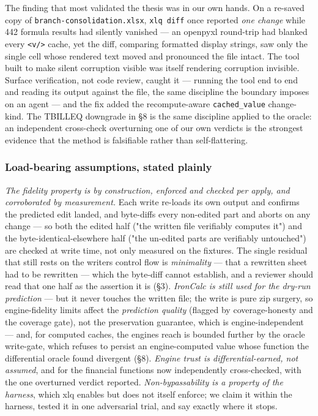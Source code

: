 \documentclass[
]{article}
\begin{document}
The finding that most validated the thesis was in our own hands. On a
re-saved copy of \texttt{branch-consolidation.xlsx}, \texttt{xlq\ diff}
once reported \emph{one change} while 442 formula results had silently
vanished --- an openpyxl round-trip had blanked every
\texttt{\textless{}v/\textgreater{}} cache, yet the diff, comparing
formatted display strings, saw only the single cell whose rendered text
moved and pronounced the file intact. The tool built to make silent
corruption visible was itself rendering corruption invisible. Surface
verification, not code review, caught it --- running the tool end to end
and reading its output against the file, the same discipline the
boundary imposes on an agent --- and the fix added the recompute-aware
\texttt{cached\_value} change-kind. The TBILLEQ downgrade in §8 is the
same discipline applied to the oracle: an independent cross-check
overturning one of our own verdicts is the strongest evidence that the
method is falsifiable rather than self-flattering.

\subsubsection{Load-bearing assumptions, stated
plainly}\label{load-bearing-assumptions-stated-plainly}

\emph{The fidelity property is by construction, enforced and checked per
apply, and corroborated by measurement.} Each write re-loads its own
output and confirms the predicted edit landed, and byte-diffs every
non-edited part and aborts on any change --- so both the edited half
("the written file verifiably computes it") and the
byte-identical-elsewhere half ("the un-edited parts are verifiably
untouched") are checked at write time, not only measured on the
fixtures. The single residual that still rests on the
writer\textquotesingle s control flow is \emph{minimality} --- that a
rewritten sheet had to be rewritten --- which the byte-diff cannot
establish, and a reviewer should read that one half as the assertion it
is (§3). \emph{IronCalc is still used for the dry-run prediction} ---
but it never touches the written file; the write is pure zip surgery, so
engine-fidelity limits affect the \emph{prediction quality} (flagged by
coverage-honesty and the coverage gate), not the preservation guarantee,
which is engine-independent --- and, for computed caches, the
engine\textquotesingle s reach is bounded further by the oracle
write-gate, which refuses to persist an engine-computed value whose
function the differential oracle found divergent (§8). \emph{Engine
trust is differential-earned, not assumed}, and for the financial
functions now independently cross-checked, with the one overturned
verdict reported. \emph{Non-bypassability is a property of the harness},
which xlq enables but does not itself enforce; we claim it within the
harness, tested it in one adversarial trial, and say exactly where it
stops.
\end{document}
